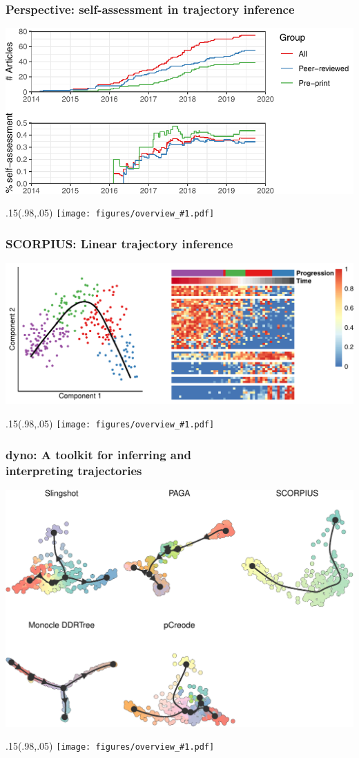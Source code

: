 \documentclass[usepdftitle=false, compress]{beamer}
\newcommand{\topright}[1]{%
\begin{textblock*}{.15\linewidth}(.98\linewidth,.05\linewidth)
	\texttt{[image: figures/overview\_\#1.pdf]}
\end{textblock*}}
\begin{document}
\begin{frame}
	\frametitle{Perspective: self-assessment in trajectory inference}
	\begin{center}
		\includegraphics[width=.8\linewidth]{figures/end_part_selfassessment.pdf}
	\end{center}
  \topright{ch8}
\end{frame}

\begin{frame}
	\frametitle{SCORPIUS: Linear trajectory inference}
	\begin{center}
		\includegraphics[width=.8\linewidth]{figures/end_part_scorpius.pdf}
	\end{center}
	\topright{ch5}
\end{frame}

\begin{frame}
	\frametitle{dyno: A toolkit for inferring and\\interpreting trajectories}
	\begin{center}
		\includegraphics[width=.9\linewidth]{figures/end_part_dyno.pdf}
	\end{center}
	\topright{ch4}
\end{frame}
\end{document}
